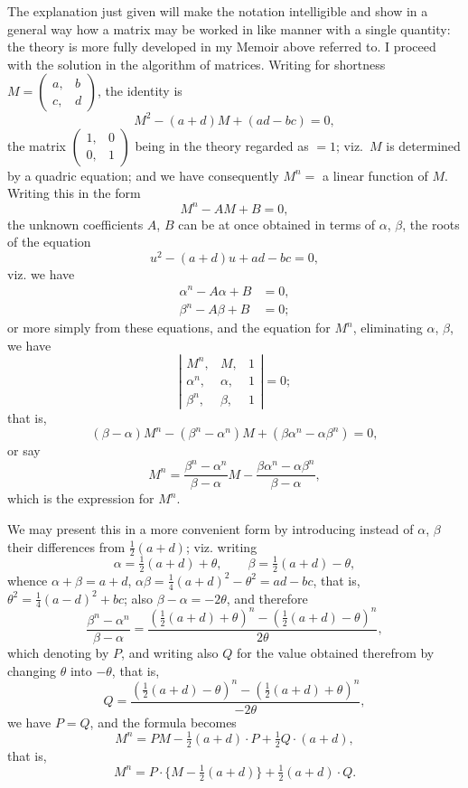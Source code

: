 \documentclass[12pt,a4paper]{article}
\begin{document}
The explanation just given will make the notation intelligible and show in a
general way how a matrix may be worked in like manner with a single quantity:
the theory is more fully developed in my Memoir above referred to. I proceed
with the solution in the algorithm of matrices. Writing for shortness
$M = \left(\begin{array}{c|c} a, & b \\ \hline c, & d \end{array}\right)$,
the identity is
%
\[
M^2 - (a+d)M + (ad-bc) = 0,
\]
%
the matrix $\left(\begin{array}{c|c} 1, & 0 \\ \hline 0, & 1 \end{array}\right)$ being in the theory regarded as $=1$;
viz.\ $M$ is determined by a quadric equation; and we have consequently $M^n =$
a linear function of $M$. Writing this in the form
%
\[
M^n - AM + B = 0,
\]
%
the unknown coefficients $A$, $B$ can be at once obtained in terms of $\alpha$, $\beta$, the roots
of the equation
%
\[
u^2 - (a+d)u + ad - bc = 0,\]
%
viz. we have
\begin{align*}
\alpha^n - A\alpha + B &= 0, \\
\beta^n - A\beta + B &= 0;
\end{align*}
or more simply from these equations, and the equation for $M^n$, eliminating $\alpha$, $\beta$, we
have
%
\[
\left|\begin{array}{ccc}
M^n, & M, & 1 \\
\alpha^n, & \alpha, & 1 \\
\beta^n, & \beta, & 1
\end{array}\right| = 0;
\]
%
that is,
%
\[
(\beta - \alpha) M^n - (\beta^n - \alpha^n) M + (\beta\alpha^n - \alpha\beta^n) = 0,
\]
%
or say
%
\[
M^n = \frac{\beta^n - \alpha^n}{\beta - \alpha} M
- \frac{\beta\alpha^n - \alpha\beta^n}{\beta - \alpha},
\]
%
which is the expression for $M^n$.

We may present this in a more convenient form by introducing instead of
$\alpha$, $\beta$ their differences from $\tfrac{1}{2}(a+d)$; viz. writing
%
\[
\alpha = \tfrac{1}{2}(a+d) + \theta, \qquad
\beta = \tfrac{1}{2}(a+d) - \theta,
\]
%
whence $\alpha + \beta = a + d$, $\alpha\beta = \tfrac{1}{4}(a+d)^2 - \theta^2 = ad-bc$, that is,
$\theta^2 = \tfrac{1}{4}(a-d)^2 + bc$; also $\beta - \alpha = -2\theta$, and therefore
%
\[
\frac{\beta^n - \alpha^n}{\beta - \alpha}
= \frac{(\tfrac{1}{2}(a+d) + \theta)^n - (\tfrac{1}{2}(a+d) - \theta)^n}{2\theta},
\]
%
which denoting by $P$, and writing also $Q$ for the value obtained therefrom by
changing $\theta$ into $-\theta$, that is,
%
\[
Q = \frac{(\tfrac{1}{2}(a+d) - \theta)^n - (\tfrac{1}{2}(a+d) + \theta)^n}{-2\theta},
\]
we have $P = Q$, and the formula becomes
%
\[
M^n = PM - \tfrac{1}{2} (a+d) \cdot P + \tfrac{1}{2} Q \cdot (a+d),
\]
%
that is,
%
\[
M^n = P \cdot \{M - \tfrac{1}{2}(a+d)\} + \tfrac{1}{2}(a+d) \cdot Q.
\]
\end{document}
